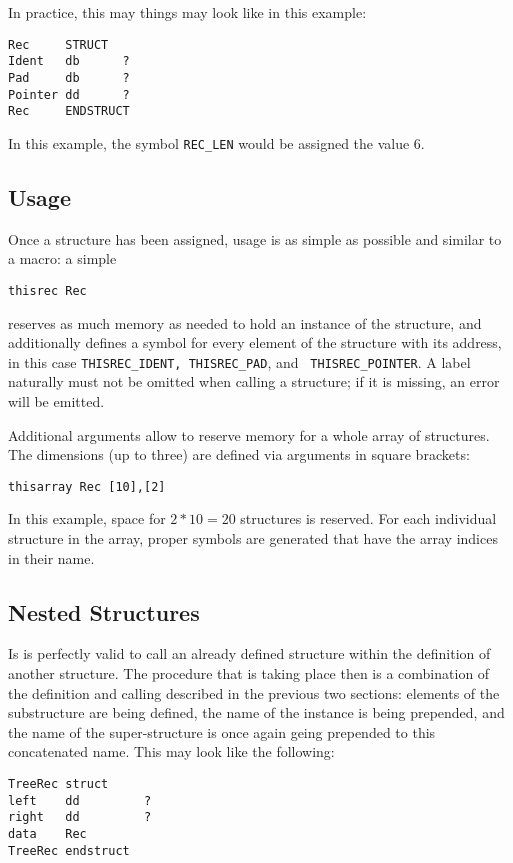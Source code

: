 \documentclass[12pt,twoside]{report}
\begin{document}
In practice, this may things may look like in this example:
\begin{verbatim}
Rec     STRUCT
Ident   db      ?
Pad     db      ?
Pointer dd      ?
Rec     ENDSTRUCT
\end{verbatim}
In this example, the symbol {\tt REC\_LEN} would be assigned the value 6.

\subsection{Usage}

Once a structure has been assigned, usage is as simple as possible and
similar to a macro: a simple
\begin{verbatim}
thisrec Rec
\end{verbatim}
reserves as much memory as needed to hold an instance of the structure,
and additionally defines a symbol for every element of the structure with
its address, in this case {\tt THISREC\_IDENT, THISREC\_PAD}, and {\tt
THISREC\_POINTER}.  A label naturally must not be omitted when calling a
structure; if it is missing, an error will be emitted.

Additional arguments allow to reserve memory for a whole array of structures.
The dimensions (up to three) are defined via arguments in square brackets:
\begin{verbatim}
thisarray Rec [10],[2]
\end{verbatim}
In this example, space for $2*10=20$ structures is reserved. For each individual
structure in the array, proper symbols are generated that have the array
indices in their name.

\subsection{Nested Structures}

Is is perfectly valid to call an already defined structure within the
definition of another structure.  The procedure that is taking place then
is a combination of the definition and calling described in the previous
two sections: elements of the substructure are being defined, the name of
the instance is being prepended, and the name of the super-structure is
once again geing prepended to this concatenated name.  This may look like
the following:
\begin{verbatim}
TreeRec struct
left    dd         ?
right   dd         ?
data    Rec
TreeRec endstruct
\end{verbatim}
\end{document}
